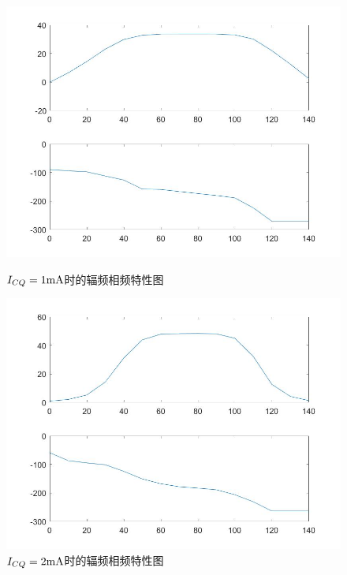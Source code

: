 \documentclass[UTF8,a4paper]{ctexart}
\begin{document}
\begin{figure}
\centering
\includegraphics[width=\textwidth]{bode1exp.jpg}
\caption{$I_{CQ}=1\rm{mA}$时的辐频相频特性图}
\label{bode1}
\includegraphics[width=\textwidth]{bode2exp.jpg}
\caption{$I_{CQ}=2\rm{mA}$时的辐频相频特性图}
\label{bode2}
\end{figure}
\end{document}

